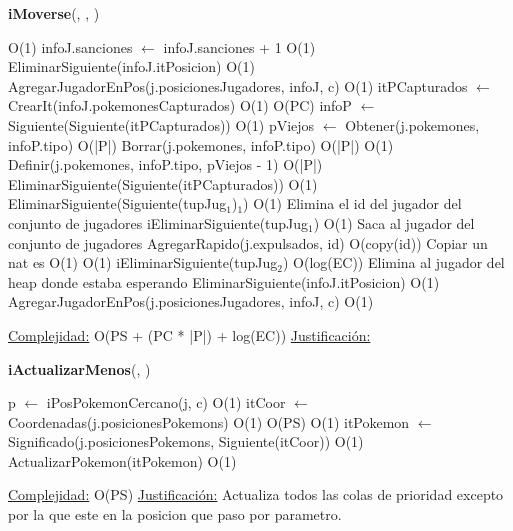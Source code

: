 \begin{algorithm}[H]{\textbf{iMoverse}(, , )}{}
\begin{algorithmic}
	\EndIf
			\Comment O(1)
			\State infoJ.sanciones $\gets$ infoJ.sanciones + 1	\Comment O(1)
			\State EliminarSiguiente(infoJ.itPosicion) \Comment O(1)
			\State AgregarJugadorEnPos(j.posicionesJugadores, infoJ, c) \Comment O(1)
		\Else
			\State itPCapturados $\gets$ CrearIt(infoJ.pokemonesCapturados)	\Comment O(1)
				\Comment O(PC)
				\State infoP $\gets$ Siguiente(Siguiente(itPCapturados))	\Comment O(1)
				\State pViejos $\gets$ Obtener(j.pokemones, infoP.tipo)	\Comment O(|P|)
				\State Borrar(j.pokemones, infoP.tipo)	\Comment O(|P|)
					\Comment O(1)
					\State Definir(j.pokemones, infoP.tipo, pViejos - 1)	\Comment O(|P|)
				\EndIf
				\State EliminarSiguiente(Siguiente(itPCapturados))	\Comment O(1)		
			\EndWhile
      \State EliminarSiguiente(Siguiente(tupJug$_{1}$)$_{1}$)	\Comment O(1) {Elimina el id del jugador del conjunto de jugadores}
			\State iEliminarSiguiente(tupJug$_{1}$)	\Comment O(1) {Saca al jugador del conjunto de jugadores}
			\State AgregarRapido(j.expulsados, id)	\Comment O(copy(id)) {Copiar un nat es O(1)}
				\Comment O(1)
				\State iEliminarSiguiente(tupJug$_{2}$)	\Comment O(log(EC)) {Elimina al jugador del heap donde estaba esperando}
			\EndIf
		\EndIf
	\Else
		\State EliminarSiguiente(infoJ.itPosicion) \Comment O(1)
		\State AgregarJugadorEnPos(j.posicionesJugadores, infoJ, c) \Comment O(1)
	\EndIf

\medskip
\Statex \underline{Complejidad:} O(PS + (PC * |P|) + log(EC))
\Statex \underline{Justificación:}
\end{algorithmic}
\end{algorithm}

\begin{algorithm}[H]{\textbf{iActualizarMenos}(, )} 
	\begin{algorithmic}
    \State p $\gets$ iPosPokemonCercano(j, c)	\Comment O(1)
		\State itCoor $\gets$ Coordenadas(j.posicionesPokemons)	\Comment O(1)
			\Comment O(PS)
				\Comment O(1)
				\State itPokemon $\gets$ Significado(j.posicionesPokemons, Siguiente(itCoor))	\Comment O(1)
					\State ActualizarPokemon(itPokemon)	\Comment O(1)
			\EndIf
		\EndWhile

	
		\medskip
		\Statex \underline{Complejidad:} O(PS)
		\Statex \underline{Justificación:} Actualiza todos las colas de prioridad excepto por la que este en la posicion que paso por parametro.
    \end{algorithmic}
\end{algorithm}

